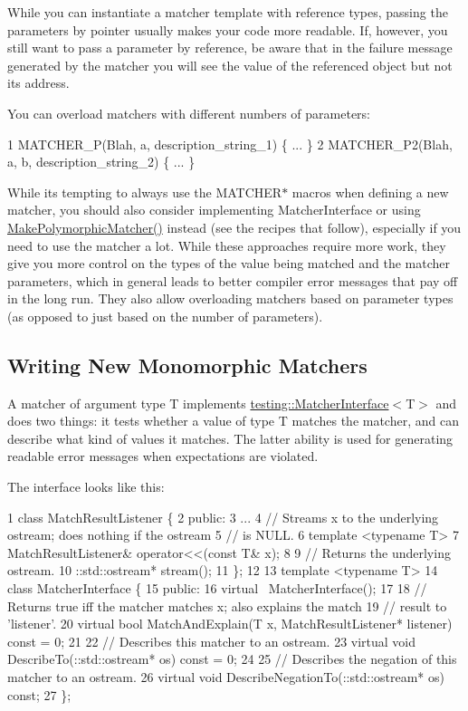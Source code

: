 While you can instantiate a matcher template with reference types, passing the parameters by pointer usually makes your code more readable. If, however, you still want to pass a parameter by reference, be aware that in the failure message generated by the matcher you will see the value of the referenced object but not its address.

You can overload matchers with different numbers of parameters\+: 
\begin{DoxyCode}
1 MATCHER\_P(Blah, a, description\_string\_1) \{ ... \}
2 MATCHER\_P2(Blah, a, b, description\_string\_2) \{ ... \}
\end{DoxyCode}


While it\textquotesingle{}s tempting to always use the {\ttfamily M\+A\+T\+C\+H\+E\+R$\ast$} macros when defining a new matcher, you should also consider implementing {\ttfamily Matcher\+Interface} or using {\ttfamily \hyperlink{namespacetesting_a667ca94f190ec2e17ee2fbfdb7d3da04}{Make\+Polymorphic\+Matcher()}} instead (see the recipes that follow), especially if you need to use the matcher a lot. While these approaches require more work, they give you more control on the types of the value being matched and the matcher parameters, which in general leads to better compiler error messages that pay off in the long run. They also allow overloading matchers based on parameter types (as opposed to just based on the number of parameters).

\subsection*{Writing New Monomorphic Matchers}

A matcher of argument type {\ttfamily T} implements {\ttfamily \hyperlink{classtesting_1_1_matcher_interface}{testing\+::\+Matcher\+Interface}$<$T$>$} and does two things\+: it tests whether a value of type {\ttfamily T} matches the matcher, and can describe what kind of values it matches. The latter ability is used for generating readable error messages when expectations are violated.

The interface looks like this\+:


\begin{DoxyCode}
1 class MatchResultListener \{
2  public:
3   ...
4   // Streams x to the underlying ostream; does nothing if the ostream
5   // is NULL.
6   template <typename T>
7   MatchResultListener& operator<<(const T& x);
8 
9   // Returns the underlying ostream.
10   ::std::ostream* stream();
11 \};
12 
13 template <typename T>
14 class MatcherInterface \{
15  public:
16   virtual ~MatcherInterface();
17 
18   // Returns true iff the matcher matches x; also explains the match
19   // result to 'listener'.
20   virtual bool MatchAndExplain(T x, MatchResultListener* listener) const = 0;
21 
22   // Describes this matcher to an ostream.
23   virtual void DescribeTo(::std::ostream* os) const = 0;
24 
25   // Describes the negation of this matcher to an ostream.
26   virtual void DescribeNegationTo(::std::ostream* os) const;
27 \};
\end{DoxyCode}


